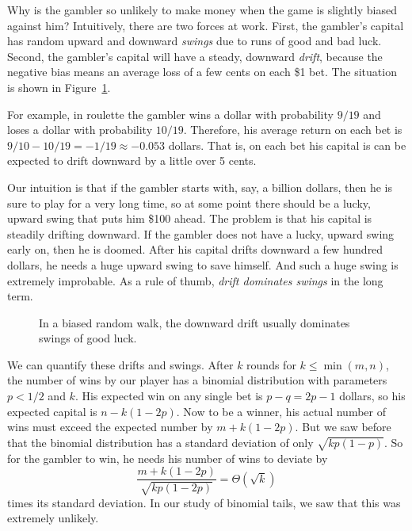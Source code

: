 Why is the gambler so unlikely to make money when the game is slightly
biased against him?  Intuitively, there are two forces at work.  First,
the gambler's capital has random upward and downward {\em swings} due to
runs of good and bad luck.  Second, the gambler's capital will have a
steady, downward {\em drift}, because the negative bias means an average
loss of a few cents on each \$1 bet.  The situation is shown in
Figure~\ref{fig:19P3}.

\begin{editingnotes}

For example, in roulette the gambler wins a dollar with probability $9/19$
and loses a dollar with probability $10/19$.  Therefore, his average
return on each bet is $9/10 - 10/19 = - 1/19 \approx -0.053$ dollars.
That is, on each bet his capital is can be expected to drift downward by a
little over 5 cents.

\end{editingnotes}

Our intuition is that if the gambler starts with, say, a billion dollars,
then he is sure to play for a very long time, so at some point there
should be a lucky, upward swing that puts him \$100 ahead.  The problem is
that his capital is steadily drifting downward.  If the gambler does not
have a lucky, upward swing early on, then he is doomed.  After his capital
drifts downward a few hundred dollars, he needs a huge upward swing to
save himself.  And such a huge swing is extremely improbable.  As a rule
of thumb, \emph{drift dominates swings} in the long term.

\begin{figure}[h]


\caption{In a biased random walk, the downward drift usually dominates
  swings of good luck.}

\label{fig:19P3}

\end{figure}

\iffalse
\begin{figure}
\centerline{\texttt{[image: walk2]}}
\caption{\em In an unfair game, the gambler's capital swings randomly up
and down, but steadily drifts downward.  If the gambler does not have
a winning swing early on, then his capital drifts downward, and later
upward swings are insufficient to make him a winner.}
\label{LN12:fig:walk2}
\end{figure}
\fi

We can quantify these drifts and swings.  After $k$ rounds for $k \le
\min(m,n)$, the number of wins by our player has a binomial distribution
with parameters $p < 1/2$ and $k$.  His expected win on any single bet is
$p-q = 2p-1$ dollars, so his expected capital is $n-k(1-2p)$.  Now to be a
winner, his actual number of wins must exceed the expected number by
$m+k(1-2p)$.  But we saw before that the binomial distribution has a
standard deviation of only $\sqrt{kp(1-p)}$.  So for the gambler to win,
he needs his number of wins to deviate by
\[
\frac{m+k(1-2p)}{\sqrt{kp(1-2p)}}=\Theta(\sqrt{k})
\]
times its standard deviation.  In our study of binomial tails, we saw that
this was extremely unlikely.

